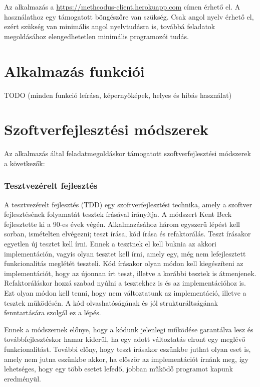 \documentclass{elteikthesis}
\begin{document}
			Az alkalmazás a \url{https://methcodus-client.herokuapp.com} címen érhető el. A használathoz egy támogatott böngészőre van szükség. Csak angol nyelv érhető el, ezért szükség van minimális angol nyelvtudásra is, továbbá feladatok megoldásához elengedhetetlen minimális programozói tudás.
		
		\section{Alkalmazás funkciói}
		TODO (minden funkció leírása, képernyőképek, helyes és hibás használat)
		
		\section{Szoftverfejlesztési módszerek}
		Az alkalmazás által feladatmegoldáskor támogatott szoftverfejlesztési módszerek a következők:
		\subsubsection{Tesztvezérelt fejlesztés}
			A tesztvezérelt fejlesztés (TDD) \cite{tdd} egy szoftverfejlesztési technika, amely a szoftver fejlesztésének folyamatát tesztek írásával irányítja. A módszert Kent Beck fejlesztette ki a 90-es évek végén. Alkalmazásához három egyszerű lépést kell sorban, ismételten elvégezni; teszt írása, kód írása és refaktorálás. Teszt írásakor egyetlen új tesztet kell írni. Ennek a tesztnek el kell buknia az akkori implementáción, vagyis olyan tesztet kell írni, amely egy, még nem lefejlesztett funkcionalitás meglétét teszteli. Kód írásakor olyan módon kell kiegészíteni az implementációt, hogy az újonnan írt teszt, illetve a korábbi tesztek is átmenjenek. Refaktoráláskor hozzá szabad nyúlni a tesztekhez is és az implementációhoz is. Ezt olyan módon kell tenni, hogy nem változtatunk az implementáció, illetve a tesztek működésén. A kód olvashatóságának és jól strukturáltságának fenntartására szolgál ez a lépés.
			
			Ennek a módszernek előnye, hogy a kódunk jelenlegi működése garantálva lesz és továbbfejlesztéskor hamar kiderül, ha egy adott változtatás elront egy meglévő funkcionalitást. További előny, hogy teszt írásakor eszünkbe juthat olyan eset is, amely nem jutna eszünkbe akkor, ha először az implementációt írnánk meg, így lehetséges, hogy egy több esetet lefedő, jobban működő programot kapunk eredményül.
\end{document}
